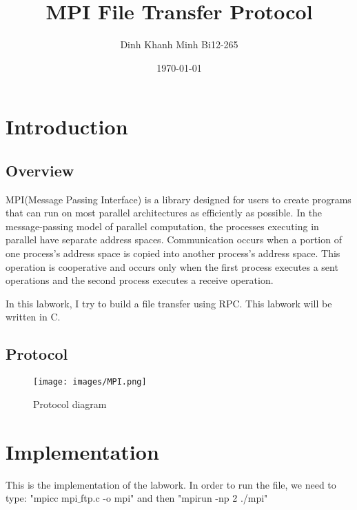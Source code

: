 \documentclass[]{article}
\begin{document}
\title{MPI File Transfer Protocol}
\author{Dinh Khanh Minh Bi12-265}
\date{\today}

\maketitle

\tableofcontents
\newpage

\section{Introduction}
\subsection{Overview}
\noindent%
MPI(Message Passing Interface) is a library designed for users to create programs that can run on most parallel architectures as efficiently as possible. In the message-passing model of parallel computation, the processes executing in parallel have separate address spaces. Communication occurs when a portion of one process’s address space is copied into another process’s address space. This operation is cooperative and occurs only when the first process executes a sent
operations and the second process executes a receive operation.\cite{MPI Concept}

\noindent%
In this labwork, I try to build a file transfer using RPC. This labwork will be written in C.

\subsection{Protocol}
\begin{figure}[h]
    \centering
    \texttt{[image: images/MPI.png]}
    \caption{Protocol diagram}
    \label{fig:protocol}
\end{figure}

\section{Implementation}
\noindent%
This is the implementation of the labwork. In order to run the file, we need to type:
"mpicc mpi$\_$ftp.c -o mpi" and then "mpirun -np 2 ./mpi"
\end{document}
